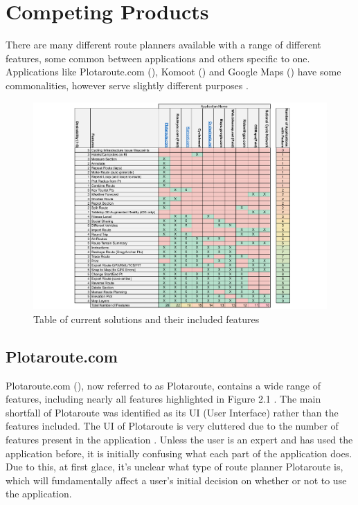 \section{Competing Products}
\label{litrev:competingproducts}

There are many different route planners available with a range of different features, some common between applications and others specific to one. Applications like Plotaroute.com (\cite{noauthor_free_nodate}), Komoot (\cite{noauthor_komoot_nodate}) and Google Maps (\cite{noauthor_google_nodate}) have some commonalities, however serve slightly different purposes .

\begin{figure}[h!]
    \centering
    \includegraphics[width=1\linewidth]{figures/current_apps.pdf}
    \caption{Table of current solutions and their included features}
    \label{fig:solutionsandfeatures}
\end{figure}

\subsection{Plotaroute.com}
\label{litrev:plotaroute}
Plotaroute.com (\cite{noauthor_free_nodate}), now referred to as Plotaroute, contains a wide range of features, including nearly all features highlighted in Figure 2.1 . The main shortfall of Plotaroute was identified as its UI (User Interface) rather than the features included. The UI of Plotaroute is very cluttered due to the number of features present in the application . Unless the user is an expert and has used the application before, it is initially confusing what each part of the application does. Due to this, at first glace, it's unclear what type of route planner Plotaroute is, which will fundamentally affect a user's initial decision on whether or not to use the application.

